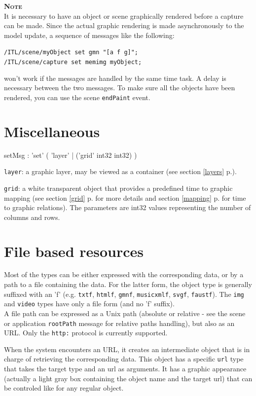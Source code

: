 \documentclass[a4paper,twoside]{report}
\newcommand{\sublevel}[1]	{\section{#1}}
\newcommand{\fullref}[1]	{\ref{#1} p.\pageref{#1}}
\newcommand{\OSC}[1]		{\texttt{#1}}
\newcommand{\note}	[1]		{\vspace{2mm}\textbf{\hspace{-0.9cm}\textbf{\textsc{Note #1}}}}
\let\olditemize\itemize
\let\oldenditemize\enditemize
\renewenvironment{itemize} 	{\olditemize \setlength{\itemsep}{1mm}}{\oldenditemize}
\newcommand{\sample}	[1]			{\vspace{-2mm}\begin{center}\colorbox{mygrey}{
								\begin{minipage}[t]{0.9\columnwidth} 
								{\small \texttt{#1}}
								\end{minipage}}\end{center}}
\begin{document}
\note{} \\
It is necessary to have an object or scene graphically rendered before a capture can be made. Since the actual graphic rendering is made asynchronously to the model update, a sequence of messages like the following:
\sample{/ITL/scene/myObject set gmn "[a f g]";\\
/ITL/scene/capture set memimg myObject;
}
won't work if the messages are handled by the same time task. A delay is necessary between the two messages. To make sure all the objects have been rendered, you can use the scene \OSC{endPaint} event.


\sublevel{Miscellaneous}
\label{miscscore}

\begin{rail}
setMsg : 'set' (
	'layer'  |
	('grid' int32 int32)
)
\end{rail}

\begin{itemize}
\item \OSC{layer}: a graphic layer, may be viewed as a container (see section \fullref{layers}).
\item \OSC{grid}: a white transparent object that provides a predefined time to graphic mapping (see section \fullref{grid} for more details and section \fullref{mapping} for time to graphic relations). The parameters are int32 values representing the number of columns and rows.
\end{itemize}


\sublevel{File based resources}
\label{filebasedrsrc}

Most of the types can be either expressed with the corresponding data, or by a path to a file containing the data. For the latter form, the object type is generally suffixed with an 'f' (e.g. \OSC{txtf}, \OSC{htmlf}, \OSC{gmnf}, \OSC{musicxmlf}, \OSC{svgf}, \OSC{faustf}). The \OSC{img} and  \OSC{video} types have only a file form (and no 'f' suffix). \\
A file path can be expressed as a Unix path (absolute or relative - see the scene or application \OSC{rootPath} message for relative paths handling), but also as an URL.
Only the \OSC{http:} protocol is currently supported.

When the system encounters an URL, it creates an intermediate object that is in charge of retrieving the corresponding data. This object has a specific \OSC{url} type that takes the target type and an url as arguments. It has a graphic appearance (actually a light gray box containing the object name and the target url) that can be controled like for any regular object.
\end{document}
